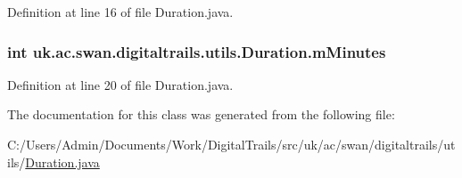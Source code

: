 Definition at line 16 of file Duration.\+java.

\hypertarget{classuk_1_1ac_1_1swan_1_1digitaltrails_1_1utils_1_1_duration_a67f7e8b424281e32a8083113443222ef}{
\subsubsection[{m\+Minutes}]{\setlength{\rightskip}{0pt plus 5cm}int uk.\+ac.\+swan.\+digitaltrails.\+utils.\+Duration.\+m\+Minutes\hspace{0.3cm}{\ttfamily [private]}}}\label{classuk_1_1ac_1_1swan_1_1digitaltrails_1_1utils_1_1_duration_a67f7e8b424281e32a8083113443222ef}


Definition at line 20 of file Duration.\+java.



The documentation for this class was generated from the following file\+:\begin{DoxyCompactItemize}
\item 
C\+:/\+Users/\+Admin/\+Documents/\+Work/\+Digital\+Trails/src/uk/ac/swan/digitaltrails/utils/\hyperlink{_duration_8java}{Duration.\+java}\end{DoxyCompactItemize}
